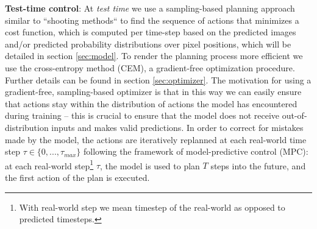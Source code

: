 \textbf{Test-time control}: At \emph{test time} we use a sampling-based planning approach similar to ``shooting methods`` to find the sequence of actions that minimizes a cost function, which is computed per time-step based on the predicted images and/or predicted probability distributions over pixel positions, which will be detailed in section \ref{sec:model}.
To render the planning process more efficient we use the cross-entropy method (CEM), a gradient-free optimization procedure. Further details can be found in section \ref{sec:optimizer}. The motivation for using a gradient-free, sampling-based optimizer is that in this way we can easily ensure that actions stay within the distribution of actions the model has encountered during training -- this is crucial to ensure that the model does not receive out-of-distribution inputs and makes valid predictions.
In order to correct for mistakes made by the model, the actions are iteratively replanned at each real-world time step $\tau \in \{0,...,\tau_{max}\}$ following the framework of model-predictive control (MPC): at each real-world step\footnote{With real-world step we mean timestep of the real-world as opposed to predicted timesteps.} $\tau$, the model is used to plan $T$ steps into the future, and the first action of the plan is executed.








